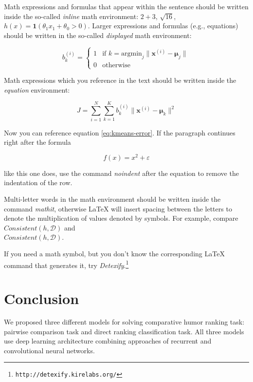 \documentclass[10pt, a4paper]{article}
\begin{document}
Math expressions and formulas that appear within the sentence should be written inside the so-called \emph{inline} math environment: $2+3$, $\sqrt{16}$, $h(x)=\mathbf{1}(\theta_1 x_1 + \theta_0>0)$. Larger expressions and formulas (e.g., equations) should be written in the so-called \emph{displayed} math environment:

\[
b^{(i)}_k = \begin{cases}
1 & \text{if 
    $k = \text{argmin}_j \| \mathbf{x}^{(i)} - \mathbf{\mu}_j \|$}\\
0 & \text{otherwise}
\end{cases}
\]

Math expressions which you reference in the text should be written inside the \textit{equation} environment:

\begin{equation}\label{eq:kmeans-error}
J = \sum_{i=1}^N \sum_{k=1}^K 
b^{(i)}_k \| \mathbf{x}^{(i)} - \mathbf{\mu}_k \|^2
\end{equation}

Now you can reference equation \eqref{eq:kmeans-error}. If the paragraph continues right after the formula

\begin{equation}
f(x) = x^2 + \varepsilon
\end{equation}

\noindent like this one does, use the command \emph{noindent} after the equation to remove the indentation of the row. 

Multi-letter words in the math environment should be written inside the command \emph{mathit}, otherwise \LaTeX{} will insert spacing between the letters to denote the multiplication of values denoted by symbols. For example, compare
$\mathit{Consistent}(h,\mathcal{D})$ and\\
$Consistent(h,\mathcal{D})$.

If you need a math symbol, but you don't know the corresponding \LaTeX{} command that generates it, try
\emph{Detexify}.\footnote{\texttt{http://detexify.kirelabs.org/}}

\section{Conclusion}

We proposed three different models for solving comparative humor ranking task: pairwise comparison task and direct ranking classification task. All three models use deep learning architecture combining approaches of recurrent and convolutional neural networks.
\end{document}
